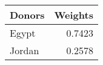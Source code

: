 \begin{tabular}{lr}
\toprule
Donors &  Weights \\
\midrule
 Egypt &   0.7423 \\
Jordan &   0.2578 \\
\bottomrule
\end{tabular}
